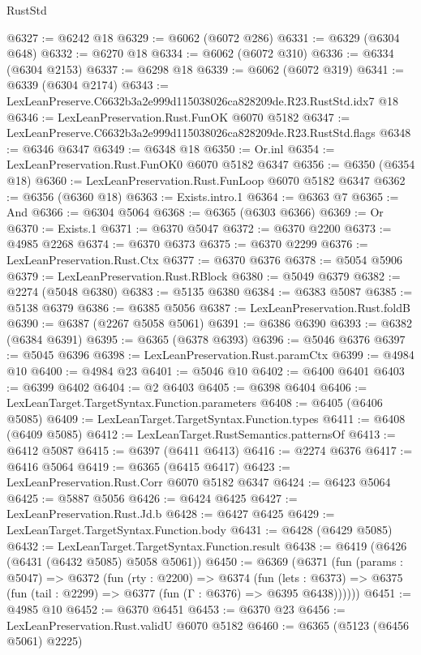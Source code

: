 \begin{lexlean}{RustStd}
\begin{coremodule}
@6327 := @6242 @18
@6329 := @6062 (@6072 @286)
@6331 := @6329 (@6304 @648)
@6332 := @6270 @18
@6334 := @6062 (@6072 @310)
@6336 := @6334 (@6304 @2153)
@6337 := @6298 @18
@6339 := @6062 (@6072 @319)
@6341 := @6339 (@6304 @2174)
@6343 := LexLeanPreserve.C6632b3a2e999d115038026ca828209de.R23.RustStd.idx7 @18
@6346 := LexLeanPreservation.Rust.FunOK @6070 @5182
@6347 := LexLeanPreserve.C6632b3a2e999d115038026ca828209de.R23.RustStd.flags
@6348 := @6346 @6347
@6349 := @6348 @18
@6350 := Or.inl
@6354 := LexLeanPreservation.Rust.FunOK0 @6070 @5182 @6347
@6356 := @6350 (@6354 @18)
@6360 := LexLeanPreservation.Rust.FunLoop @6070 @5182 @6347
@6362 := @6356 (@6360 @18)
@6363 := Exists.intro.{1}
@6364 := @6363 @7
@6365 := And
@6366 := @6304 @5064
@6368 := @6365 (@6303 @6366)
@6369 := Or
@6370 := Exists.{1}
@6371 := @6370 @5047
@6372 := @6370 @2200
@6373 := @4985 @2268
@6374 := @6370 @6373
@6375 := @6370 @2299
@6376 := LexLeanPreservation.Rust.Ctx
@6377 := @6370 @6376
@6378 := @5054 @5906
@6379 := LexLeanPreservation.Rust.RBlock
@6380 := @5049 @6379
@6382 := @2274 (@5048 @6380)
@6383 := @5135 @6380
@6384 := @6383 @5087
@6385 := @5138 @6379
@6386 := @6385 @5056
@6387 := LexLeanPreservation.Rust.foldB
@6390 := @6387 (@2267 @5058 @5061)
@6391 := @6386 @6390
@6393 := @6382 (@6384 @6391)
@6395 := @6365 (@6378 @6393)
@6396 := @5046 @6376
@6397 := @5045 @6396
@6398 := LexLeanPreservation.Rust.paramCtx
@6399 := @4984 @10
@6400 := @4984 @23
@6401 := @5046 @10
@6402 := @6400 @6401
@6403 := @6399 @6402
@6404 := @2 @6403
@6405 := @6398 @6404
@6406 := LexLeanTarget.TargetSyntax.Function.parameters
@6408 := @6405 (@6406 @5085)
@6409 := LexLeanTarget.TargetSyntax.Function.types
@6411 := @6408 (@6409 @5085)
@6412 := LexLeanTarget.RustSemantics.patternsOf
@6413 := @6412 @5087
@6415 := @6397 (@6411 @6413)
@6416 := @2274 @6376
@6417 := @6416 @5064
@6419 := @6365 (@6415 @6417)
@6423 := LexLeanPreservation.Rust.Corr @6070 @5182 @6347
@6424 := @6423 @5064
@6425 := @5887 @5056
@6426 := @6424 @6425
@6427 := LexLeanPreservation.Rust.Jd.b
@6428 := @6427 @6425
@6429 := LexLeanTarget.TargetSyntax.Function.body
@6431 := @6428 (@6429 @5085)
@6432 := LexLeanTarget.TargetSyntax.Function.result
@6438 := @6419 (@6426 (@6431 (@6432 @5085) @5058 @5061))
@6450 := @6369
    (@6371
      (fun (params : @5047) =>
      @6372
        (fun (rty : @2200) =>
        @6374
          (fun (lets : @6373) =>
          @6375 (fun (tail : @2299) => @6377 (fun (Γ : @6376) => @6395 @6438))))))
@6451 := @4985 @10
@6452 := @6370 @6451
@6453 := @6370 @23
@6456 := LexLeanPreservation.Rust.validU @6070 @5182
@6460 := @6365 (@5123 (@6456 @5061) @2225)

\end{coremodule}
\end{lexlean}

